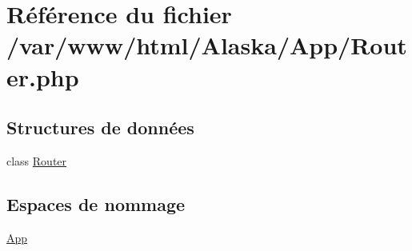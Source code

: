 \hypertarget{_router_8php}{}\section{Référence du fichier /var/www/html/\+Alaska/\+App/\+Router.php}
\label{_router_8php}
\subsection*{Structures de données}
\begin{DoxyCompactItemize}
\item 
class \hyperlink{class_app_1_1_router}{Router}
\end{DoxyCompactItemize}
\subsection*{Espaces de nommage}
\begin{DoxyCompactItemize}
\item 
 \hyperlink{namespace_app}{App}
\end{DoxyCompactItemize}
